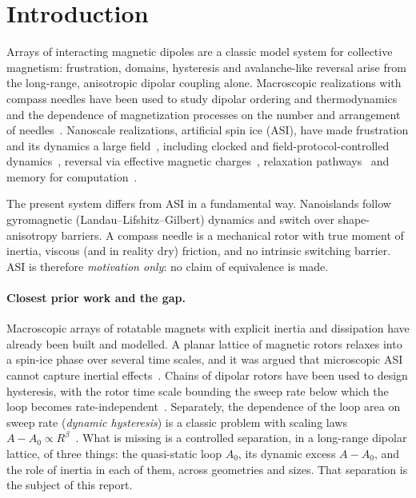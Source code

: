\documentclass[11pt,a4paper]{article}
\begin{document}
\section{Introduction}
\label{sec:intro}

Arrays of interacting magnetic dipoles are a classic model system for collective magnetism: frustration, domains, hysteresis and avalanche-like reversal arise from the long-range, anisotropic dipolar coupling alone. Macroscopic realizations with compass needles have been used to study dipolar ordering and thermodynamics~\cite{olive1998} and the dependence of magnetization processes on the number and arrangement of needles~\cite{novak2004}. Nanoscale realizations, artificial spin ice (ASI), have made frustration and its dynamics a large field~\cite{nisoli2013,skjaervoe2020}, including clocked and field-protocol-controlled dynamics~\cite{jensen2024}, reversal via effective magnetic charges~\cite{mellado2010}, relaxation pathways~\cite{menniti2025} and memory for computation~\cite{taniguchi2025}.

The present system differs from ASI in a fundamental way. Nanoislands follow gyromagnetic (Landau--Lifshitz--Gilbert) dynamics and switch over shape-anisotropy barriers. A compass needle is a mechanical rotor with true moment of inertia, viscous (and in reality dry) friction, and no intrinsic switching barrier. ASI is therefore \emph{motivation only}: no claim of equivalence is made.

\paragraph{Closest prior work and the gap.} Macroscopic arrays of rotatable magnets with explicit inertia and dissipation have already been built and modelled. A planar lattice of magnetic rotors relaxes into a spin-ice phase over several time scales, and it was argued that microscopic ASI cannot capture inertial effects~\cite{mellado2012}. Chains of dipolar rotors have been used to design hysteresis, with the rotor time scale bounding the sweep rate below which the loop becomes rate-independent~\cite{concha2017}. Separately, the dependence of the loop area on sweep rate (\emph{dynamic hysteresis}) is a classic problem with scaling laws $A-A_0\propto R^{\beta}$~\cite{rao1990}. What is missing is a controlled separation, in a long-range dipolar lattice, of three things: the quasi-static loop $A_0$, its dynamic excess $A-A_0$, and the role of inertia in each of them, across geometries and sizes. That separation is the subject of this report.
\end{document}
